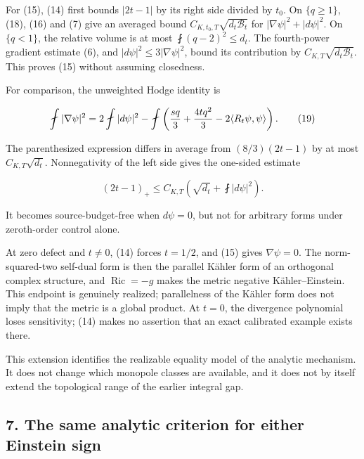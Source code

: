 \documentclass[
  10pt,
]{article}
\begin{document}
For (15), (14) first bounds \(|2t-1|\) by its right side divided by
\(t_0\). On \(\{q\ge1\}\), (18), (16) and (7) give an averaged bound
\(C_{K,t_0,T}\sqrt{d_t\mathcal B_t}\) for \(|\nabla\psi|^2+|d\psi|^2\).
On \(\{q<1\}\), the relative volume is at most \(\fint(q-2)^2\le d_t\).
The fourth-power gradient estimate (6), and
\(|d\psi|^2\le3|\nabla\psi|^2\), bound its contribution by
\(C_{K,T}\sqrt{d_t\mathcal B_t}\). This proves (15) without assuming
closedness.

For comparison, the unweighted Hodge identity is

\[
 \fint|\nabla\psi|^2
 =2\fint|d\psi|^2-
  \fint\left({s q\over3}+{4tq^2\over3}
                               -2\langle R_t\psi,\psi\rangle\right).
                                                               \tag{19}
\]

The parenthesized expression differs in average from \((8/3)(2t-1)\) by
at most \(C_{K,T}\sqrt{d_t}\). Nonnegativity of the left side gives the
one-sided estimate

\[
 (2t-1)_+\le C_{K,T}\left(\sqrt{d_t}+\fint|d\psi|^2\right).
                                                               \tag{20}
\]

It becomes source-budget-free when \(d\psi=0\), but not for arbitrary
forms under zeroth-order control alone.

At zero defect and \(t\ne0\), (14) forces \(t=1/2\), and (15) gives
\(\nabla\psi=0\). The norm-squared-two self-dual form is then the
parallel Kähler form of an orthogonal complex structure, and
\(\operatorname{Ric}=-g\) makes the metric negative Kähler--Einstein.
This endpoint is genuinely realized; parallelness of the Kähler form
does not imply that the metric is a global product. At \(t=0\), the
divergence polynomial loses sensitivity; (14) makes no assertion that an
exact calibrated example exists there.

This extension identifies the realizable equality model of the analytic
mechanism. It does not change which monopole classes are available, and
it does not by itself extend the topological range of the earlier
integral gap.

\hypertarget{the-same-analytic-criterion-for-either-einstein-sign}{%
\subsection{7. The same analytic criterion for either Einstein
sign}\label{the-same-analytic-criterion-for-either-einstein-sign}}
\end{document}
